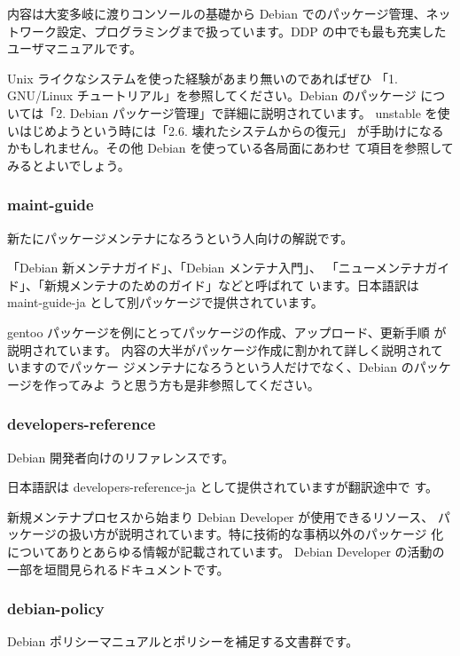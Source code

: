 \documentclass[mingoth,a4paper]{jsarticle}
\begin{document}
内容は大変多岐に渡りコンソールの基礎から Debian でのパッケージ管理、ネッ
トワーク設定、プログラミングまで扱っています。DDP の中でも最も充実した
ユーザマニュアルです。

Unix ライクなシステムを使った経験があまり無いのであればぜひ
「1. GNU/Linux チュートリアル」を参照してください。Debian のパッケージ
については「2. Debian パッケージ管理」で詳細に説明されています。
unstable を使いはじめようという時には「2.6. 壊れたシステムからの復元」
が手助けになるかもしれません。その他 Debian を使っている各局面にあわせ
て項目を参照してみるとよいでしょう。


\subsubsection{maint-guide}

新たにパッケージメンテナになろうという人向けの解説です。

「Debian 新メンテナガイド」、「Debian メンテナ入門」、
「ニューメンテナガイド」、「新規メンテナのためのガイド」などと呼ばれて
います。日本語訳は maint-guide-ja として別パッケージで提供されています。

gentoo パッケージを例にとってパッケージの作成、アップロード、更新手順
が説明されています。
内容の大半がパッケージ作成に割かれて詳しく説明されていますのでパッケー
ジメンテナになろうという人だけでなく、Debian のパッケージを作ってみよ
うと思う方も是非参照してください。


\subsubsection{developers-reference}

Debian 開発者向けのリファレンスです。

日本語訳は developers-reference-ja として提供されていますが翻訳途中で
す。

新規メンテナプロセスから始まり Debian Developer が使用できるリソース、
パッケージの扱い方が説明されています。特に技術的な事柄以外のパッケージ
化についてありとあらゆる情報が記載されています。
Debian Developer の活動の一部を垣間見られるドキュメントです。


\subsubsection{debian-policy}

Debian ポリシーマニュアルとポリシーを補足する文書群です。
\end{document}
